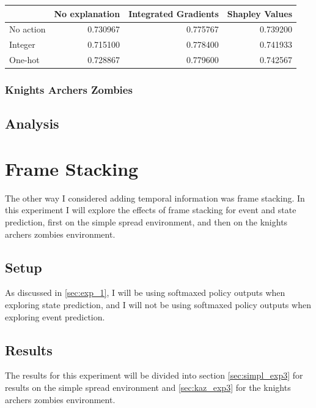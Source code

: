 \documentclass[UKenglish]{uiomasterthesis}
\begin{document}
\begin{center}
\label{tab:event_simpl_lstm}
\begin{tabular}{lrrr}
\toprule
 & No explanation & Integrated Gradients & Shapley Values \\
\midrule
No action & 0.730967 & 0.775767 & 0.739200 \\
Integer & 0.715100 & 0.778400 & 0.741933 \\
One-hot & 0.728867 & 0.779600 & 0.742567 \\
\bottomrule
\end{tabular}
\end{center}

\subsubsection{Knights Archers Zombies}


\subsection{Analysis}


\section{Frame Stacking}
\label{sec:exp_3}
The other way I considered adding temporal information was frame stacking. In this experiment I will explore the effects of frame stacking for event and state prediction, first on the simple spread environment, and then on the knights archers zombies environment. 

\subsection{Setup}
As discussed in \ref{sec:exp_1}, I will be using softmaxed policy outputs when exploring state prediction, and I will not be using softmaxed policy outputs when exploring event prediction.

\subsection{Results}
The results for this experiment will be divided into section \ref{sec:simpl_exp3} for results on the simple spread environment and \ref{sec:kaz_exp3} for the knights archers zombies environment.
\end{document}
